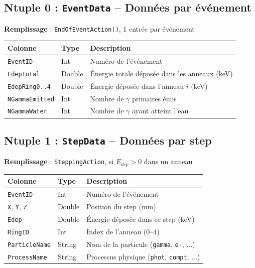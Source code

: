 \documentclass[11pt,a4paper]{article}
\newcommand{\code}[1]{\texttt{#1}}
\begin{document}
\subsection{Ntuple 0 : \code{EventData} -- Données par événement}

\textbf{Remplissage} : \code{EndOfEventAction()}, 1 entrée par événement

\begin{table}[h]
\centering
\begin{tabular}{p{3.5cm} p{2cm} p{8cm}}
    \toprule
    \rowcolor{headerblue!20}
    \textbf{Colonne} & \textbf{Type} & \textbf{Description} \\
    \midrule
    \code{EventID} & Int & Numéro de l'événement \\
    \rowcolor{lightgray}
    \code{EdepTotal} & Double & Énergie totale déposée dans les anneaux (keV) \\
    \code{EdepRing0..4} & Double & Énergie déposée dans l'anneau $i$ (keV) \\
    \rowcolor{lightgray}
    \code{NGammaEmitted} & Int & Nombre de $\gamma$ primaires émis \\
    \code{NGammaWater} & Int & Nombre de $\gamma$ ayant atteint l'eau \\
    \bottomrule
\end{tabular}
\end{table}

\subsection{Ntuple 1 : \code{StepData} -- Données par step}

\textbf{Remplissage} : \code{SteppingAction}, si $E_{dep} > 0$ dans un anneau

\begin{table}[h]
\centering
\begin{tabular}{p{3.5cm} p{2cm} p{8cm}}
    \toprule
    \rowcolor{headerblue!20}
    \textbf{Colonne} & \textbf{Type} & \textbf{Description} \\
    \midrule
    \code{EventID} & Int & Numéro de l'événement \\
    \rowcolor{lightgray}
    \code{X}, \code{Y}, \code{Z} & Double & Position du step (mm) \\
    \code{Edep} & Double & Énergie déposée dans ce step (keV) \\
    \rowcolor{lightgray}
    \code{RingID} & Int & Index de l'anneau (0--4) \\
    \code{ParticleName} & String & Nom de la particule (\code{gamma}, \code{e-}, ...) \\
    \rowcolor{lightgray}
    \code{ProcessName} & String & Processus physique (\code{phot}, \code{compt}, ...) \\
    \bottomrule
\end{tabular}
\end{table}
\end{document}
